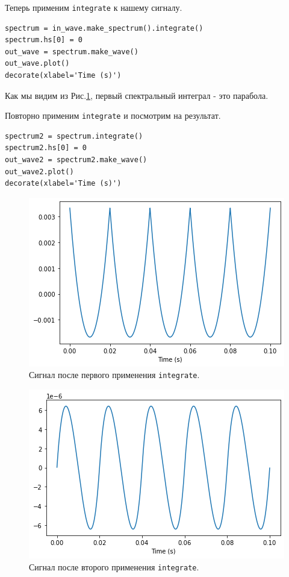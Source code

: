 \documentclass[a4paper, 14pt]{extarticle}
\begin{document}
    Теперь применим \texttt{integrate} к нашему сигналу.

    \begin{lstlisting}[caption= Применение \texttt{integrate}., label={lst:task4_out_integrate_1}]
spectrum = in_wave.make_spectrum().integrate()
spectrum.hs[0] = 0
out_wave = spectrum.make_wave()
out_wave.plot()
decorate(xlabel='Time (s)')     \end{lstlisting}

    Как мы видим из Рис.\ref{fig:task4_out_integrate_1}, первый спектральный интеграл - это парабола.

    Повторно применим \texttt{integrate} и посмотрим на результат.

    \begin{lstlisting}[caption= Второе применение \texttt{integrate}., label={lst:task4_out_integrate_2}]
spectrum2 = spectrum.integrate()
spectrum2.hs[0] = 0
out_wave2 = spectrum2.make_wave()
out_wave2.plot()
decorate(xlabel='Time (s)')     \end{lstlisting}

    \begin{figure}[H]
        \centering
        \includegraphics[width=0.8\linewidth]{resources/Images/task4_out_integrate_1}
        \caption{Сигнал после первого применения \texttt{integrate}.}
        \label{fig:task4_out_integrate_1}
    \end{figure}

    \begin{figure}[H]
        \centering
        \includegraphics[width=0.8\linewidth]{resources/Images/task4_out_integrate_2}
        \caption{Сигнал после второго применения \texttt{integrate}.}
        \label{fig:task4_out_integrate_2}
    \end{figure}
\end{document}
